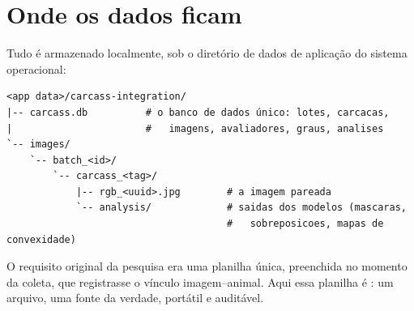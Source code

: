 \section{Onde os dados ficam}

Tudo é armazenado localmente, sob o diretório de dados de aplicação do sistema
operacional:

\begin{lstlisting}
<app data>/carcass-integration/
|-- carcass.db          # o banco de dados único: lotes, carcacas,
|                       #   imagens, avaliadores, graus, analises
`-- images/
    `-- batch_<id>/
        `-- carcass_<tag>/
            |-- rgb_<uuid>.jpg        # a imagem pareada
            `-- analysis/             # saidas dos modelos (mascaras,
                                      #   sobreposicoes, mapas de convexidade)
\end{lstlisting}

\begin{note}[title={O banco de dados único é a "planilha única"}]
O requisito original da pesquisa era uma planilha única, preenchida no momento da
coleta, que registrasse o vínculo imagem--animal. Aqui essa planilha é
: um arquivo, uma fonte da verdade, portátil e auditável.
\end{note}
